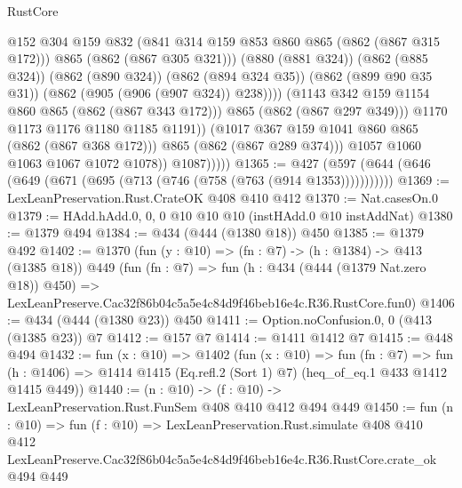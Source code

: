 \begin{lexlean}{RustCore}
\begin{coremodule}
                                @152
                                @304
                                @159
                                @832
                                (@841 @314 @159 @853 @860 @865 (@862 (@867 @315 @172)))
                                @865
                                (@862 (@867 @305 @321)))
                              (@880 (@881 @324))
                              (@862 (@885 @324))
                              (@862 (@890 @324))
                              (@862 (@894 @324 @35))
                              (@862 (@899 @90 @35 @31))
                              (@862 (@905 (@906 (@907 @324)) @238))))
                          (@1143 @342 @159 @1154 @860 @865 (@862 (@867 @343 @172)))
                          @865
                          (@862 (@867 @297 @349)))
                        @1170
                        @1173
                        @1176
                        @1180
                        @1185
                        @1191))
                    (@1017 @367 @159 @1041 @860 @865 (@862 (@867 @368 @172)))
                    @865
                    (@862 (@867 @289 @374)))
                  @1057
                  @1060
                  @1063
                  @1067
                  @1072
                  @1078))
              @1087)))))
@1365 := @427 (@597 (@644 (@646 (@649 (@671 (@695 (@713 (@746 (@758 (@763 (@914 @1353)))))))))))
@1369 := LexLeanPreservation.Rust.CrateOK @408 @410 @412
@1370 := Nat.casesOn.{0}
@1379 := HAdd.hAdd.{0, 0, 0} @10 @10 @10 (instHAdd.{0} @10 instAddNat)
@1380 := @1379 @494
@1384 := @434 (@444 (@1380 @18)) @450
@1385 := @1379 @492
@1402 := @1370
    (fun (y : @10) => (fn : @7) -> (h : @1384) -> @413 (@1385 @18))
    @449
    (fun (fn : @7) =>
    fun (h : @434 (@444 (@1379 Nat.zero @18)) @450) =>
    LexLeanPreserve.Cac32f86b04c5a5e4c84d9f46beb16e4c.R36.RustCore.fun0)
@1406 := @434 (@444 (@1380 @23)) @450
@1411 := Option.noConfusion.{0, 0} (@413 (@1385 @23)) @7
@1412 := @157 @7
@1414 := @1411 @1412 @7
@1415 := @448 @494
@1432 := fun (x : @10) =>
  @1402
    (fun (x : @10) =>
    fun (fn : @7) =>
    fun (h : @1406) => @1414 @1415 (Eq.refl.{2} (Sort 1) @7) (heq_of_eq.{1} @433 @1412 @1415 @449))
@1440 := (n : @10) -> (f : @10) -> LexLeanPreservation.Rust.FunSem @408 @410 @412 @494 @449
@1450 := fun (n : @10) =>
  fun (f : @10) =>
  LexLeanPreservation.Rust.simulate
    @408
    @410
    @412
    LexLeanPreserve.Cac32f86b04c5a5e4c84d9f46beb16e4c.R36.RustCore.crate_ok
    @494
    @449
\end{coremodule}
\end{lexlean}
